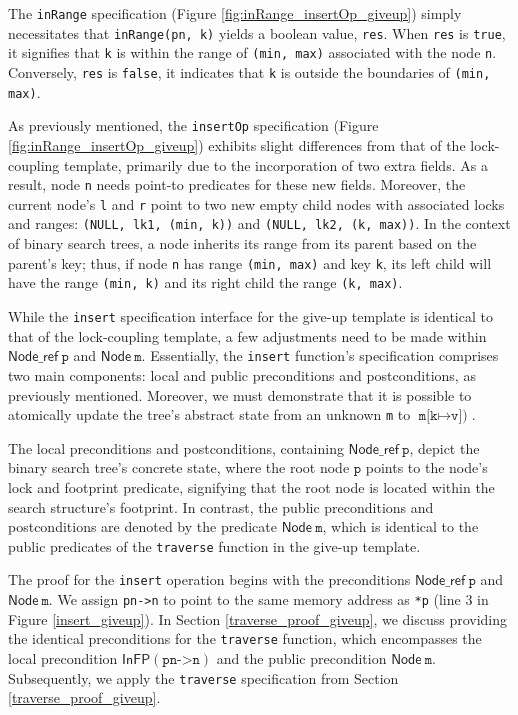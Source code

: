 \documentclass[a4paper,UKenglish,cleveref, autoref, thm-restate]{lipics-v2021}
\newcommand{\treerep}{\ensuremath{\mathsf{Node}}}
\newcommand{\nodeboxrep}{\ensuremath{\mathsf{Node\_ref}}}
\newcommand{\infp}{\ensuremath{\mathsf{InFP}}}
\begin{document}
The \texttt{inRange} specification (Figure \ref{fig:inRange_insertOp_giveup}) simply necessitates that \texttt{inRange(pn, k)}  yields a boolean value, \texttt{res}. When \texttt{res} is \texttt{true}, it signifies that \texttt{k} is within the range of \texttt{(min, max)} associated with the node \texttt{n}. 
Conversely, \texttt{res} is \texttt{false}, it indicates that \texttt{k} is outside the boundaries of \texttt{(min, max)}. 

As previously mentioned, the \texttt{insertOp} specification (Figure \ref{fig:inRange_insertOp_giveup}) exhibits slight differences from that of the lock-coupling template, primarily due to the incorporation of two extra fields. As a result, node \texttt{n} needs point-to predicates for these new fields. Moreover, the current node's \texttt{l} and \texttt{r} point to two new empty child nodes with associated locks and ranges: \texttt{(NULL, lk1, (min, k))} and \texttt{(NULL, lk2, (k, max))}.  In the context of binary search trees, a node inherits its range from its parent based on the parent's key; thus, if node \texttt{n} has range \texttt{(min, max)} and key \texttt{k}, its left child will have the range \texttt{(min, k)} and its right child the range \texttt{(k, max)}. 




While the \texttt{insert} specification interface for the give-up template is identical to that of the lock-coupling template, a few adjustments need to be made within $\nodeboxrep\ \texttt{p}$ and $\treerep \ \texttt{m}$. Essentially, the \texttt{insert} function's specification comprises two main components: local and public preconditions and postconditions, as previously mentioned. Moreover, we must demonstrate that it is possible to atomically update the tree's abstract state from an unknown \texttt{m} to $\texttt{m[k} \mapsto \texttt{v])}$.

The local preconditions and postconditions, containing $\nodeboxrep \ \texttt{p}$, depict the binary search tree's concrete state, where the root node $\texttt{p}$ points to the node's lock and footprint predicate, signifying that the root node is located within the search structure's footprint. In contrast, the public preconditions and postconditions are denoted by the predicate  $\treerep \ \texttt{m}$, which is identical to the public predicates of the \texttt{traverse} function in the give-up template. 

The proof for the \texttt{insert} operation begins with the preconditions $\nodeboxrep \ \texttt{p}$ and $\treerep \ \texttt{m}$. We assign \texttt{pn->n} to point to the same memory address as \texttt{*p} (line 3 in Figure \ref{insert_giveup}). In Section \ref{traverse_proof_giveup}, we discuss providing the identical preconditions for the \texttt{traverse} function, which encompasses the local precondition $\infp(\texttt{pn->n})$ and the public precondition $\treerep\ \texttt{m}$. Subsequently, we apply the \texttt{traverse} specification from Section \ref{traverse_proof_giveup}.
\end{document}
